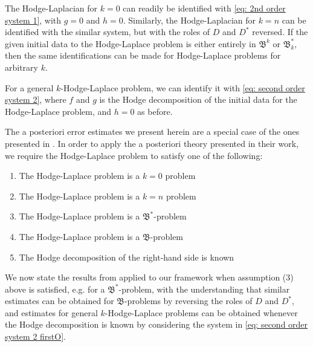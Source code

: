 \documentclass[reqno]{amsart}
\numberwithin{equation}{section}
\theoremstyle{definition}
\newcommand{\Bf}{\mathfrak{B}}
\begin{document}
The Hodge-Laplacian for $k=0$ can readily be identified with \cref{eq: 2nd order system 1}, with $g = 0$ and $h = 0$. Similarly, the Hodge-Laplacian for $k=n$ can be identified with the similar system, but with the roles of $D$ and $D^*$ reversed. If the given initial data to the Hodge-Laplace problem is either entirely in $\Bf^k$ or $\Bf^*_k$, then the same identifications can be made for Hodge-Laplace problems for arbitrary $k$.

For a general $k$-Hodge-Laplace problem, we can identify it with \cref{eq: second order system 2}, where $f$ and $g$ is the Hodge decomposition of the initial data for the Hodge-Laplace problem, and $h =0$ as before.

The a posteriori error estimates we present herein are a special case of the ones presented in \cite{pauly2020solution}. In order to apply the a posteriori theory presented in their work, we require the Hodge-Laplace problem to satisfy one of the following:
\begin{enumerate}
    \item The Hodge-Laplace problem is a $k=0$ problem
    \item The Hodge-Laplace problem is a $k=n$ problem
    \item The Hodge-Laplace problem is a $\Bf^*$-problem
    \item The Hodge-Laplace problem is a $\Bf$-problem
    \item The Hodge decomposition of the right-hand side is known
\end{enumerate}

We now state the results from \cite[Theorem 4.7]{pauly2020solution} applied to our framework when assumption (3) above is satisfied, e.g. for a $\Bf^*$-problem, with the understanding that similar estimates can be obtained for $\Bf$-problems by reversing the roles of $D$ and $D^*$, and estimates for general $k$-Hodge-Laplace problems can be obtained whenever the Hodge decomposition is known by considering the system in \cref{eq: second order system 2 firstO}.
\end{document}
